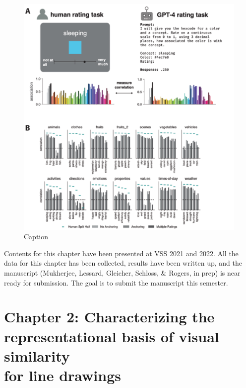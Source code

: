 \documentclass{Dissertate}
\begin{document}
\begin{figure}[htpb!]
    \centering
    \includegraphics[width=.8\linewidth]{proposal/figures/chap1b.pdf}
    \caption{Caption}
    \label{fig:enter-label}
\end{figure}

\begin{tcolorbox}[
    colback=gray!10,  %
    colframe=black!50, %
    arc=4mm,         %
    boxrule=2pt      %
]
Contents for this chapter have been presented at VSS 2021 and 2022. All the data for this chapter has been collected, results have been written up, and the manuscript (Mukherjee, Lessard, Gleicher, Schloss, \& Rogers, in prep) is near ready for submission.
The goal is to submit the manuscript this semester.
\end{tcolorbox}

\section*{Chapter 2: Characterizing the representational basis of visual similarity \\ for line drawings}
\end{document}
